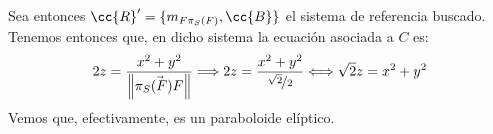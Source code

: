 \begin{ejercicio}
    Sea entonces $\cc{R}'=\{m_{F \pi_S(F)},\cc{B}\}$ el sistema de referencia buscado. Tenemos entonces que, en dicho sistema la ecuación asociada a $C$ es:
    \begin{equation*}
        2z = \frac{x^2+y^2}{\left\|\vec{\pi_S(F)F}\right\|} \Longrightarrow 2z = \frac{x^2+y^2}{\nicefrac{\sqrt{2}}{2}} \Longleftrightarrow \sqrt{2}z = x^2+y^2
    \end{equation*}
    Vemos que, efectivamente, es un paraboloide elíptico.

    \begin{comment}
    Calculamos ahora su ecuación en el sistema de referencia usual. La matriz de cambio de sistema de referencia es:
    \begin{equation*}
        M(Id, \cc{R}, \cc{R}_0) = \left(\begin{array}{c|ccc}
            1 & 0 & 0 & 0 \\ \hline
            \nicefrac{1}{4} & 0 & \nicefrac{1}{\sqrt{2}} & \nicefrac{1}{\sqrt{2}} \\
            0 & 1 & 0 & 0 \\
            \nicefrac{3}{4} & 0 & \nicefrac{1}{\sqrt{2}} & -\nicefrac{1}{\sqrt{2}}
        \end{array}\right)
    \end{equation*}

    Por tanto, tenemos que la matriz asociada a $C$ en el sistema de referencia usual es:
    \begin{align*}
        M(C, \cc{R}_0) &= [M(Id, \cc{R}, \cc{R}_0)^{-1}]^t \cdot M(C, \cc{R}) \cdot M(Id, \cc{R}, \cc{R}_0)^{-1} =\\&
        = \left(
            \begin{array}{cccc}
                0 & -1 & 0 & 0 \\
                -1 & \nicefrac{1}{2} & 0 & \nicefrac{1}{2} \\
                0 & 0 & 1 & 0 \\
                0 & \nicefrac{1}{2} & 0 & \nicefrac{1}{2}
            \end{array}
        \right)
    \end{align*}
\end{comment}
\end{ejercicio}